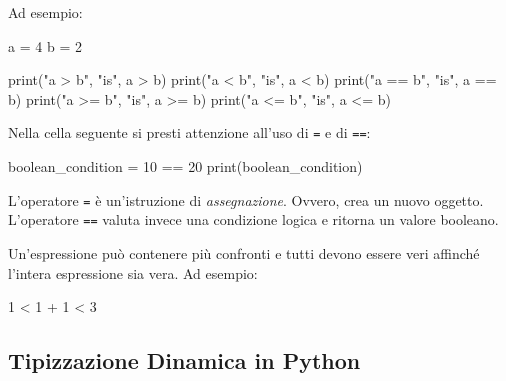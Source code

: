 \documentclass[
  letterpaper,
  krantz2]{{[}./krantz{]}}
\newenvironment{Shaded}{\begin{snugshade}}{\end{snugshade}}
\newcommand{\BuiltInTok}[1]{\textcolor[rgb]{0.00,0.23,0.31}{#1}}
\newcommand{\DecValTok}[1]{\textcolor[rgb]{0.68,0.00,0.00}{#1}}
\newcommand{\NormalTok}[1]{\textcolor[rgb]{0.00,0.23,0.31}{#1}}
\newcommand{\OperatorTok}[1]{\textcolor[rgb]{0.37,0.37,0.37}{#1}}
\newcommand{\StringTok}[1]{\textcolor[rgb]{0.13,0.47,0.30}{#1}}
\begin{document}
Ad esempio:

\begin{Shaded}
\begin{Highlighting}[]
\NormalTok{a }\OperatorTok{=} \DecValTok{4}
\NormalTok{b }\OperatorTok{=} \DecValTok{2}

\BuiltInTok{print}\NormalTok{(}\StringTok{"a \textgreater{} b"}\NormalTok{, }\StringTok{"is"}\NormalTok{, a }\OperatorTok{\textgreater{}}\NormalTok{ b)}
\BuiltInTok{print}\NormalTok{(}\StringTok{"a \textless{} b"}\NormalTok{, }\StringTok{"is"}\NormalTok{, a }\OperatorTok{\textless{}}\NormalTok{ b)}
\BuiltInTok{print}\NormalTok{(}\StringTok{"a == b"}\NormalTok{, }\StringTok{"is"}\NormalTok{, a }\OperatorTok{==}\NormalTok{ b)}
\BuiltInTok{print}\NormalTok{(}\StringTok{"a \textgreater{}= b"}\NormalTok{, }\StringTok{"is"}\NormalTok{, a }\OperatorTok{\textgreater{}=}\NormalTok{ b)}
\BuiltInTok{print}\NormalTok{(}\StringTok{"a \textless{}= b"}\NormalTok{, }\StringTok{"is"}\NormalTok{, a }\OperatorTok{\textless{}=}\NormalTok{ b)}
\end{Highlighting}
\end{Shaded}

Nella cella seguente si presti attenzione all'uso di \texttt{=} e di
\texttt{==}:

\begin{Shaded}
\begin{Highlighting}[]
\NormalTok{boolean\_condition }\OperatorTok{=} \DecValTok{10} \OperatorTok{==} \DecValTok{20}
\BuiltInTok{print}\NormalTok{(boolean\_condition)}
\end{Highlighting}
\end{Shaded}

L'operatore \texttt{=} è un'istruzione di \emph{assegnazione}. Ovvero,
crea un nuovo oggetto. L'operatore \texttt{==} valuta invece una
condizione logica e ritorna un valore booleano.

Un'espressione può contenere più confronti e tutti devono essere veri
affinché l'intera espressione sia vera. Ad esempio:

\begin{Shaded}
\begin{Highlighting}[]
\DecValTok{1} \OperatorTok{\textless{}} \DecValTok{1} \OperatorTok{+} \DecValTok{1} \OperatorTok{\textless{}} \DecValTok{3}
\end{Highlighting}
\end{Shaded}

\subsection{Tipizzazione Dinamica in
Python}\label{tipizzazione-dinamica-in-python}
\end{document}
